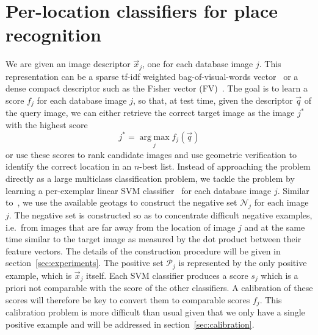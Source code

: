 \section{Per-location classifiers for place recognition}
\label{sec:classifiers}
   We are given an image descriptor $\vec{x}_j$, one for each database image $j$. This representation can be a sparse tf-idf weighted bag-of-visual-words vector~\cite{Sivic03} or a dense compact descriptor such as the Fisher vector (FV)~\cite{Jegou12}. The goal is to learn a score $f_j$ for each database image $j$, so that, at test time, given the descriptor $\vec{q}$ of the query image, we can either retrieve the correct target image as the image $j^*$ with the highest score
   \begin{equation}
   \label{eq:class}
    j^*=\operatorname*{arg\;max}_{j} f_j(\vec{q}) 
   \end{equation}
   \noindent
   or use these scores to rank candidate images and use geometric verification to identify the correct location in an $n$-best list.
   Instead of approaching the problem directly as a large multiclass classification problem, we tackle the problem by learning a per-exemplar linear SVM classifier~\cite{Malisiewicz11}  for each database image $j$.
   Similar to~\cite{Knopp2010}, we use the available geotags to construct the negative set $\mathcal N_j$ for each image $j$. The negative set is constructed so as to concentrate difficult negative examples, i.e.\ from images that are far away from the location of image $j$ and at the same time similar to the target image as measured by the dot product between their feature vectors. The details of the construction procedure will be given in section~\ref{sec:experiments}.  The positive set $\mathcal P_j$ is represented by the only positive example, which is $\vec{x}_j$ itself. 
   Each SVM classifier produces a score $s_j$ which is a priori not comparable with the score of the other classifiers. A calibration of these scores will therefore be key to convert them to comparable scores $f_j$. This calibration problem is more difficult than usual given that we only have a single positive example and will be addressed in section~\ref{sec:calibration}.
   
